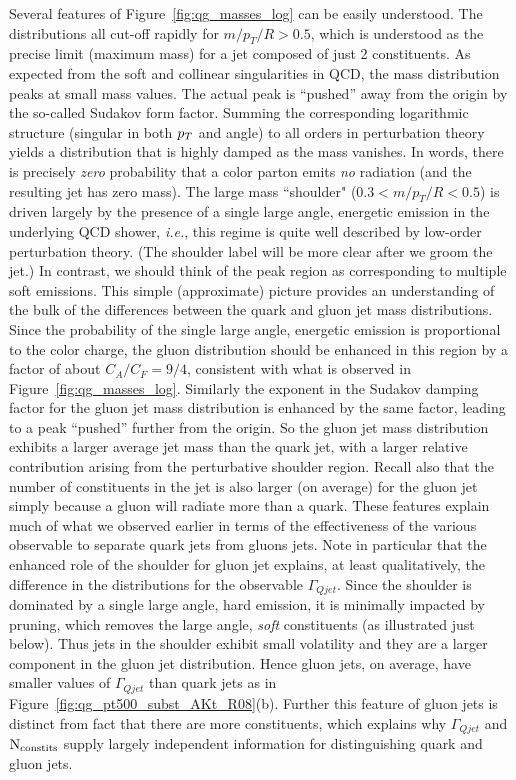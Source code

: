 Several features of Figure~\ref{fig:qg_masses_log} can be easily understood.  The distributions all cut-off rapidly for $m/p_T/R > 0.5$, which is understood as
the precise limit (maximum mass) for a jet composed of just 2 constituents.  As expected from the soft and collinear singularities in QCD, the mass distribution peaks 
at small mass values.  The actual peak is ``pushed'' away from the origin by the so-called Sudakov form factor.  Summing the corresponding logarithmic structure 
(singular in both $p_T$ and angle) to all orders in perturbation theory yields a distribution that is highly damped  as the mass vanishes.  In words, there is precisely 
\textit{zero} probability that a color parton emits \textit{no} radiation (and the resulting jet has zero mass). 
 The large mass ``shoulder" ($0.3 < m/p_T/R < 0.5$) is driven largely by the presence of a single large angle, energetic
emission in the underlying QCD shower, \textit{i.e.}, this regime is quite well described by low-order perturbation theory. 
 (The shoulder label will be more clear after we groom the jet.)
In contrast, we should think of the peak region as corresponding to multiple soft emissions.  This simple (approximate) picture 
provides an understanding of the bulk of the
differences between the quark and gluon jet mass distributions.  Since the probability of the single large angle, energetic emission is proportional to the color charge,
the gluon distribution should be enhanced in this region by a factor of about $C_A/C_F = 9/4$, consistent with what is observed in Figure~\ref{fig:qg_masses_log}.
Similarly the exponent in the Sudakov damping factor for the gluon jet mass distribution  is enhanced by the same factor, 
leading to a peak ``pushed'' further from the origin.  So the gluon jet mass 
distribution exhibits a larger average jet mass than the quark jet, with a larger relative contribution arising from the perturbative shoulder region.  Recall also that
the number of constituents in the jet is also larger (on average) for the gluon jet simply because a gluon will radiate more than a quark.  
These features explain much of what we observed earlier in terms of the effectiveness of the various observable to separate quark jets from gluons jets.
Note in particular that the enhanced role of the shoulder for gluon jet explains, at least qualitatively, the difference in the distributions for the observable 
$\Gamma_{Qjet}$.  Since the shoulder is dominated by a single large angle, hard emission, it is minimally impacted by pruning,
which removes the large angle, \textit{soft} constituents (as illustrated just below). Thus jets in the shoulder exhibit small volatility and they are a larger
component in the gluon jet distribution.  Hence gluon jets, on average, have smaller values of  $\Gamma_{Qjet}$ than quark jets as in 
Figure~\ref{fig:qg_pt500_subst_AKt_R08}(b).  Further this feature of gluon jets is distinct from fact that there are more constituents, which explains why
$\Gamma_{Qjet}$ and $\rm{N_ {constits}}$ supply largely independent information for distinguishing quark and gluon jets. 

